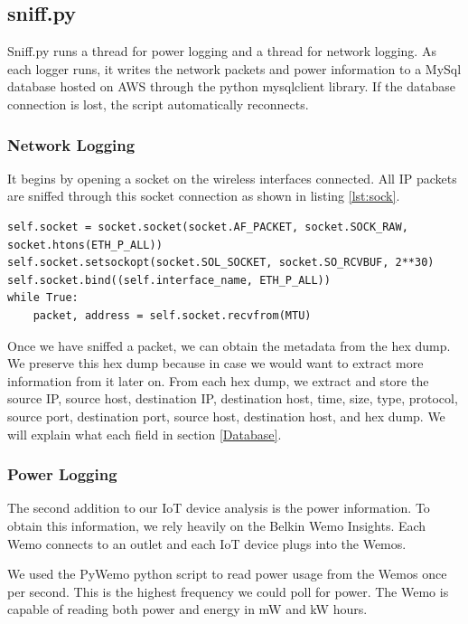 \subsection{sniff.py}
\label{sniff.py}

Sniff.py runs a thread for power logging and a thread for network logging. As each logger runs, it writes the network packets and power information to a MySql database hosted on AWS through the python mysqlclient \cite{mysqlclient} library. If the database connection is lost, the script automatically reconnects.

\subsubsection{Network Logging}

It begins by opening a socket on the wireless interfaces connected. All IP packets are sniffed through this socket connection as shown in listing \ref{lst:sock}.

\begin{lstlisting}[label={lst:sock},caption={Open and Read from a Socket},captionpos=b]
self.socket = socket.socket(socket.AF_PACKET, socket.SOCK_RAW, socket.htons(ETH_P_ALL))
self.socket.setsockopt(socket.SOL_SOCKET, socket.SO_RCVBUF, 2**30)
self.socket.bind((self.interface_name, ETH_P_ALL))
while True:
    packet, address = self.socket.recvfrom(MTU)
\end{lstlisting}

Once we have sniffed a packet, we can obtain the metadata from the hex dump. We preserve this hex dump because in case we would want to extract more information from it later on. From each hex dump, we extract and store the source IP, source host, destination IP, destination host, time, size, type, protocol, source port, destination port, source host, destination host, and hex dump. We will explain what each field in section \ref{Database}.

\subsubsection{Power Logging}

The second addition to our IoT device analysis is the power information. To obtain this information, we rely heavily on the Belkin Wemo Insights. Each Wemo connects to an outlet and each IoT device plugs into the Wemos.

We used the PyWemo python script \cite{pywemo} to read power usage from the Wemos once per second. This is the highest frequency we could poll for power. The Wemo is capable of reading both power and energy in mW and kW hours.

